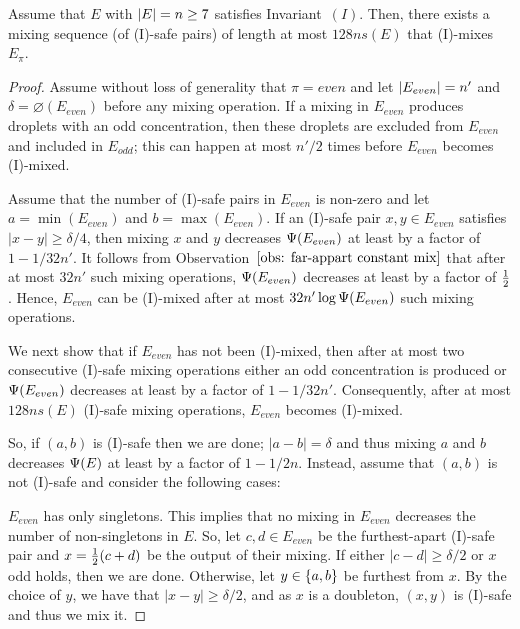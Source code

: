 
\begin{lemma}\label{lem: E-mix c_pi n >= 22}
	Assume that $E$ with ${|E|}=n\geq 7$ satisfies Invariant~$(I)$.
	Then, there exists a mixing sequence (of (I)-safe pairs) 
	of length at most $128ns(E)$ that (I)-mixes $E_\pi$.
\end{lemma}

\begin{proof}
	Assume without loss of generality that $\pi = even$ and let ${|E_{even}|}=n'$ and
	$\delta=\diameter(E_{even})$ before any mixing operation.
	If a mixing in $E_{even}$ produces droplets with an odd concentration,
	then these droplets are excluded from $E_{even}$ and included in $E_{odd}$;
	this can happen at most $n'/2$ times before $E_{even}$ becomes (I)-mixed.
	
	Assume that the number of (I)-safe pairs in $E_{even}$ is non-zero and 
	let $a=\min(E_{even})$ and $b=\max(E_{even})$.
	If an (I)-safe pair $x,y\in E_{even}$ satisfies $|x-y|\geq \delta/4$,
	then mixing $x$ and $y$ decreases 
	${\Psi}(E_{even})$ at least by a factor of $1-1/32n'$.
	It follows from Observation~$\ref{obs: far-appart constant mix}$
	that after at most $32n'$ such mixing operations, ${\Psi}(E_{even})$
	decreases at least by a factor of ${\textstyle\frac{1}{2}}$.
	Hence, $E_{even}$ can be (I)-mixed after at most $32n'\log{{\Psi}(E_{even})}$
	such mixing operations.
	
	We next show that if $E_{even}$ has not been (I)-mixed, then
	after at most two consecutive (I)-safe mixing operations
	either an odd concentration is produced 
	or ${\Psi}(E_{even})$ decreases at least by a factor of $1-1/32n'$.
	Consequently, after at most $128ns(E)$ (I)-safe mixing operations, $E_{even}$ becomes (I)-mixed.
	
	So, if $(a,b)$ is (I)-safe then we are done; $|a-b|= \delta$
	and thus mixing $a$ and $b$ decreases ${\Psi}(E)$ at least by a factor of $1-1/2n$.
	Instead, assume that $(a,b)$ is not (I)-safe and consider the following cases:
	
	\medskip\noindent{} $E_{even}$ has only singletons.
	This implies that no mixing in $E_{even}$ decreases the number of non-singletons in $E$.
	So, let $c,d\in E_{even}$ be the furthest-apart (I)-safe pair
	and $x={\textstyle\frac{1}{2}}(c+d)$ be the output of their mixing.
	If either $|c-d|\geq \delta/2$ or $x$ odd holds, then we are done.
	Otherwise, let $y\in{ \left\{ a,b \right\} }$ be furthest from $x$.
	By the choice of $y$, we have that $|x-y|\geq \delta/2$,
	and as $x$ is a doubleton, $(x,y)$ is (I)-safe and thus we mix it.
	

\end{proof}
